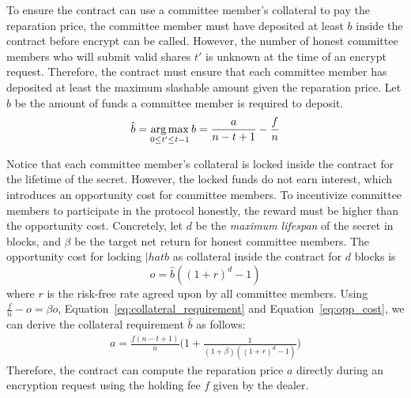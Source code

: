 To ensure the contract can use a committee member's collateral to pay the reparation price, the committee member must have deposited at least $b$ inside the contract before \textsf{encrypt} can be called.
However, the number of honest committee members who will submit valid shares $t'$ is unknown at the time of an \textsf{encrypt} request.
Therefore, the contract must ensure that each committee member has deposited at least the maximum slashable amount given the reparation price.
Let $\hat{b}$ be the amount of funds a committee member is required to deposit.
\begin{equation}\label{eq:collateral_requirement}
    \hat{b} = \operatorname*{arg\,max}_{0 \leq t' \leq t - 1} b = \frac{a}{n - t + 1} - \frac{f}{n}
\end{equation}

Notice that each committee member's collateral is locked inside the contract for the lifetime of the secret.
However, the locked funds do not earn interest, which introduces an opportunity cost for committee members.
To incentivize committee members to participate in the protocol honestly, the reward must be higher than the opportunity cost.
Concretely, let $d$ be the \emph{maximum lifespan} of the secret in blocks, and $\beta$ be the target net return for honest committee members.
The opportunity cost for locking $|hat{b}$ as collateral inside the contract for $d$ blocks is
\begin{equation}\label{eq:opp_cost}
    o = \hat{b}((1 + r)^d - 1)
\end{equation}
where $r$ is the risk-free rate agreed upon by all committee members.
Using $\frac{f}{n} - o = \beta o$, Equation~\ref{eq:collateral_requirement} and Equation~\ref{eq:opp_cost}, we can derive the collateral requirement $\hat{b}$ as follows:
\begin{gather}\label{eq:collateral_from_holding_fee}
    a = \frac{f(n - t + 1)}{n}\biggl(1 + \frac{1}{(1 + \beta)((1 + r)^d - 1)}\biggr)
\end{gather}
Therefore, the contract can compute the reparation price $a$ directly during an encryption request using the holding fee $f$ given by the dealer.

